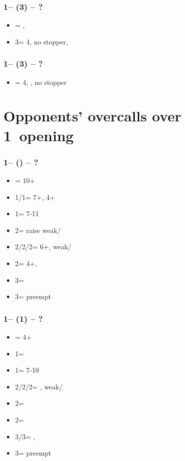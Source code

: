 \documentclass[12pt, a4paper]{report}
\begin{document}
\subsubsection*{1\clubs -- (3\hearts) -- ?}
\begin{itemize}
    \item \dbl = \spades, \invp
    \item 3\spades = 4\spades, no \hearts stopper, \gf
\end{itemize}

\subsubsection*{1\clubs -- (3\spades) -- ?}
\begin{itemize}
    \item \dbl = 4\hearts, \gf, no \spades stopper
\end{itemize}

\section*{\colorbox{blue!30}{Opponents' overcalls over 1\diams\ opening}}

\subsubsection*{1\diams -- (\dbl) -- ?}
\begin{itemize}
    \item \rdbl = 10+
    \item 1\hearts/1\spades = 7+\hcp, 4+
    \item 1\nt = 7-11
    \item 2\clubs = \diams raise weak/\gf
    \item 2\diams/2\hearts/2\spades = \trsf{\hearts/\spades/\clubs} 6+, weak/\gf
    \item 2\nt = 4+\diams, \invp
    \item 3\clubs = \inv
    \item 3\diams = preempt
\end{itemize}

\subsubsection*{1\diams -- (1\hearts) -- ?}
\begin{itemize}
    \item \dbl = 4+\spades
    \item 1\spades = \nt
    \item 1\nt = 7-10
    \item 2\clubs/2\hearts/2\spades = \trsf{\diams/\spades/\clubs}, weak/\gf
    \item 2\diams = \diams\ \inv
    \item 2\nt = \inv
    \item 3\clubs/3\spades = \nat, \inv
    \item 3\diams = preempt
\end{itemize}
\end{document}
